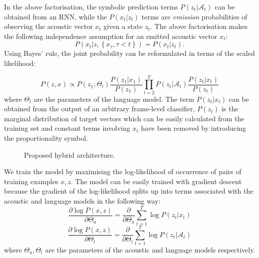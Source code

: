 \documentclass{article}
\begin{document}
In the above factorisation, the symbolic prediction terms $P(z_t|\mathcal{A}_t)$ can be obtained from an RNN, while the $P(x_t|z_t)$ terms are \emph{emission} probabilities of observing the acoustic vector $x_t$ given a state $z_t$. The above factorisation makes the following independence assumption for an emitted acoustic vector $x_t$:
\begin{equation}
\label{independence}
P(x_t | z, \left\{ x_{\tau} , \tau < t \right\}) = P(x_t | z_t). 
\end{equation}
Using Bayes' rule, the joint probability can be reformulated in terms of the scaled likelihood:

\begin{equation}
P(z,x) \propto P(z_1;\Theta_l) \frac{P(z_1|x_{1})}{P(z_1)} \prod_{t=2}^{T} P(z_t|\mathcal{A}_t) \frac{P(z_t|x_t)}{P(z_t)}
\end{equation} where $\Theta_l$ are the parameters of the language model. 
The term $P(z_t|x_t)$ can be obtained from the output of an arbitrary frame-level classifier, $P(z_t)$ is the marginal distribution of target vectors which can be easily calculated from the training set and constant terms involving $x_t$ have been removed by introducing the proportionality symbol. 

\begin{figure}[]
\begin{minipage}[b]{1.0\linewidth}
  \centering
  \resizebox{240pt}{!}{}
\end{minipage}
\label{fig:res}
\caption{Proposed hybrid architecture.}
\end{figure}

We train the model by maximising the log-likelihood of occurrence of pairs of training examples $x,z$. The model can be easily trained with gradient descent because the gradient of the log-likelihood splits up into terms associated with the acoustic and language models in the following way:
\begin{equation}
\label{train_1}
\frac{\partial \log P(x,z)}{\partial \Theta_a} = \frac{\partial}{\partial \Theta_a} \sum_{t=1}^T \log P(z_t|x_t)
\end{equation}
\begin{equation}
\label{train_2}
\frac{\partial \log P(x,z)}{\partial \Theta_l} = \frac{\partial}{\partial \Theta_l} \sum_{t=1}^T \log P(z_t|\mathcal A_t)
\end{equation}
where $\Theta_a,\Theta_l$ are the parameters of the acoustic and language models respectively. 
\end{document}
